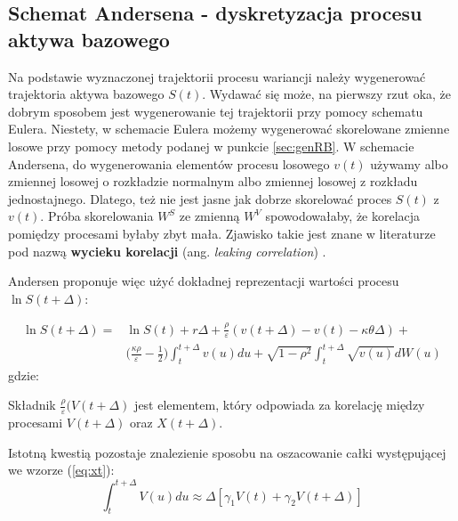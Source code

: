 \documentclass{pracamgr}
\begin{document}
\subsection{Schemat Andersena - dyskretyzacja procesu aktywa bazowego}

Na podstawie wyznaczonej trajektorii procesu wariancji należy wygenerować trajektoria aktywa bazowego 
$S(t)$. Wydawać się może, na pierwszy rzut oka, że dobrym sposobem jest wygenerowanie tej trajektorii 
przy pomocy schematu Eulera. Niestety, w schemacie Eulera możemy wygenerować skorelowane zmienne 
losowe przy pomocy metody podanej w punkcie \ref{sec:genRB}.
W schemacie Andersena, do wygenerowania elementów procesu losowego $v(t)$ używamy albo zmiennej 
losowej o rozkładzie normalnym albo zmiennej losowej z rozkładu jednostajnego. Dlatego, też nie jest 
jasne jak dobrze skorelować proces $S(t)$ z $v(t)$. Próba skorelowania $W^S$ ze zmienną $W^V$
spowodowałaby, że korelacja pomiędzy procesami byłaby zbyt mała. Zjawisko takie jest znane w 
literaturze pod nazwą \textbf{wycieku korelacji} 
(ang. \textit{leaking correlation}) \cite{Andersen}. 

Andersen proponuje więc użyć dokładnej reprezentacji wartości procesu $\ln S(t + \Delta)$:

\begin{equation}
\begin{aligned}
\label{eq:xt}
\ln S(t + \Delta) = & \ln S(t) + r \Delta + \frac{\rho}{\varepsilon} (v(t + \Delta)  - v(t) - \kappa \theta \Delta) + \\
& \Big( \frac{\kappa \rho}{\varepsilon} - \frac{1}{2} \Big)
\int_t^{t+\Delta} v(u) du + \sqrt{1-\rho^2} \int_t^{t+\Delta} \sqrt{v(u)}dW(u)
\end{aligned}
\end{equation}
gdzie:

Składnik $\frac{\rho}{\varepsilon} (V(t + \Delta)$ jest elementem, który odpowiada za korelację między 
procesami $V(t + \Delta)$ oraz $X(t + \Delta)$.

Istotną kwestią pozostaje znalezienie sposobu na oszacowanie całki występującej we wzorze (\ref{eq:xt}):
\begin{equation}
  \int_t^{t+\Delta}  V(u) du \approx \Delta [\gamma_1 V(t) + \gamma_2 V(t + \Delta)]
\end{equation}
\end{document}
